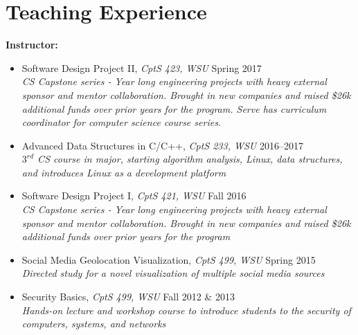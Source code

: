 \AOCLine
\section*{Teaching Experience}
\label{sec:teachingexperience}

\textbf{Instructor:}

  \begin{itemize}
    \item{Software Design Project II, \textit{CptS 423, WSU} \hfill Spring 2017} \\
    \indent \textit{CS Capstone series - Year long engineering projects with heavy external sponsor and mentor collaboration. Brought in new companies and raised \$26k additional funds over prior years for the program. Serve has curriculum coordinator for computer science course series.}
  \end{itemize}

  \begin{itemize}
    \item{Advanced Data Structures in C/C++, \textit{CptS 233, WSU} \hfill 2016--2017} \\
    \indent \textit{$3^{rd}$ CS course in major, starting algorithm analysis, Linux, data structures, and introduces Linux as a development platform}
  \end{itemize}

  \begin{itemize}
    \item{Software Design Project I, \textit{CptS 421, WSU} \hfill Fall 2016} \\
    \indent \textit{CS Capstone series - Year long engineering projects with heavy external sponsor and mentor collaboration. Brought in new companies and raised \$26k additional funds over prior years for the program}
  \end{itemize}

  \begin{itemize}
    \item{Social Media Geolocation Visualization, \textit{CptS 499, WSU} \hfill Spring 2015} \\
    \indent \textit{Directed study for a novel visualization of multiple social media sources}
  \end{itemize}

  \begin{itemize}
    \item{Security Basics, \textit{CptS 499, WSU} \hfill Fall 2012 \& 2013} \\
    \indent \textit{Hands-on lecture and workshop course to introduce students to the security of } \\
    \indent \textit{computers, systems, and networks}
  \end{itemize}

